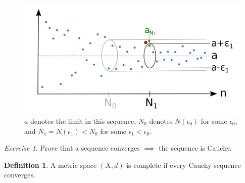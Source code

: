 \documentclass[11pt]{article}
\theoremstyle{plain}
\theoremstyle{definition}
\newtheorem{defi}{Definition}[section]
\theoremstyle{remark}
\newtheorem{exc}{Exercise}[section]
\begin{document}
\begin{figure}
    \centering
    \includegraphics[width=\linewidth]{figures/limit.png}
    \caption{$a$ denotes the limit in this sequence, $N_0$ denotes $N(\epsilon_0)$ for some $\epsilon_0$, and $N_1 = N(\epsilon_1) < N_0$ for some $\epsilon_1 < \epsilon_0$.}
\end{figure}
\begin{exc}
    Prove that a sequence converges $\implies$ the sequence is Cauchy.
\end{exc}
\begin{defi}
    A metric space $(X,d)$ is complete if every Cauchy sequence converges.
\end{defi}
\end{document}

